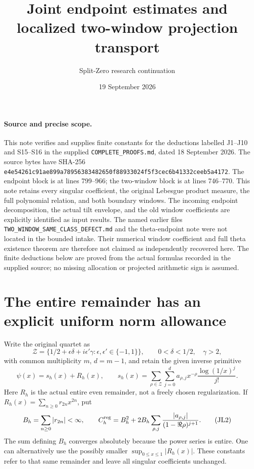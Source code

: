 \documentclass[11pt]{article}
\title{Joint endpoint estimates and localized two-window projection transport}
\author{Split-Zero research continuation}
\date{19 September 2026}
\begin{document}
\maketitle

\paragraph{Source and precise scope.}
This note verifies and supplies finite constants for the deductions labelled
J1--J10 and S15--S16 in the supplied \texttt{COMPLETE\_PROOFS.md}, dated
18 September 2026.  The source bytes have SHA-256
\texttt{e4e54261c91ae899a78956383482650f88933024f5f3cec6b41332ceeb5a4172}.
The endpoint block is at lines 799--966; the two-window block is at
lines 746--770.  This note retains every singular coefficient, the original
Lebesgue product measure, the full polynomial relation, and both boundary
windows.  The incoming endpoint decomposition, the actual tilt envelope,
and the old window coefficients are explicitly identified as input results.
The named earlier files \texttt{TWO\_WINDOW\_SAME\_CLASS\_DEFECT.md} and the
theta-endpoint note were not located in the bounded intake.  Their numerical
window coefficient and full theta existence theorem are therefore not
claimed as independently recovered here.  The finite deductions below are
proved from the actual formulas recorded in the supplied source; no missing
allocation or projected arithmetic sign is assumed.

\section{The entire remainder has an explicit uniform norm allowance}

Write the original quartet as
\[
\mathcal Z=\{1/2+\epsilon\delta+i\epsilon'\gamma:
                 \epsilon,\epsilon'\in\{-1,1\}\},
\qquad 0<\delta<1/2,\quad\gamma>2,
\]
with common multiplicity \(m\), \(d=m-1\), and retain the given inverse
primitive
\[
\psi(x)=s_h(x)+R_h(x),\qquad
s_h(x)=\sum_{\rho\in\mathcal Z}\sum_{j=0}^{d}
a_{\rho,j}x^{-\rho}\frac{\log(1/x)^j}{j!}.
\tag{JL1}
\]
Here \(R_h\) is the actual entire even remainder, not a freely chosen
regularization.  If
\(R_h(x)=\sum_{n\ge0}r_{2n}x^{2n}\), put
\[
B_h=\sum_{n\ge0}|r_{2n}|<\infty,\qquad
C_h^{\rm reg}=B_h^2+
2B_h\sum_{\rho,j}
\frac{|a_{\rho,j}|}{(1-\Re\rho)^{j+1}}.
\tag{JL2}
\]
The sum defining \(B_h\) converges absolutely because the power series
is entire.  One can alternatively use the possibly smaller
\(\sup_{0\le x\le1}|R_h(x)|\).  These constants refer to that same remainder
and leave all singular coefficients unchanged.
\end{document}
